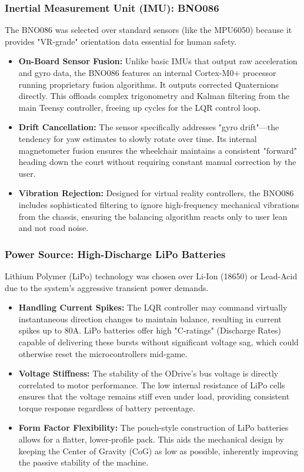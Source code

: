 \documentclass[12pt]{article}
\begin{document}
\subsubsection{Inertial Measurement Unit (IMU): BNO086}
The BNO086 was selected over standard sensors (like the MPU6050) because it provides "VR-grade" orientation data essential for human safety.
\begin{itemize}
    \item \textbf{On-Board Sensor Fusion:} Unlike basic IMUs that output raw acceleration and gyro data, the BNO086 features an internal Cortex-M0+ processor running proprietary fusion algorithms. It outputs corrected Quaternions directly. This offloads complex trigonometry and Kalman filtering from the main Teensy controller, freeing up cycles for the LQR control loop.
    \item \textbf{Drift Cancellation:} The sensor specifically addresses "gyro drift"—the tendency for yaw estimates to slowly rotate over time. Its internal magnetometer fusion ensures the wheelchair maintains a consistent "forward" heading down the court without requiring constant manual correction by the user.
    \item \textbf{Vibration Rejection:} Designed for virtual reality controllers, the BNO086 includes sophisticated filtering to ignore high-frequency mechanical vibrations from the chassis, ensuring the balancing algorithm reacts only to user lean and not road noise.
\end{itemize}

\subsubsection{Power Source: High-Discharge LiPo Batteries}
Lithium Polymer (LiPo) technology was chosen over Li-Ion (18650) or Lead-Acid due to the system's aggressive transient power demands.
\begin{itemize}
    \item \textbf{Handling Current Spikes:} The LQR controller may command virtually instantaneous direction changes to maintain balance, resulting in current spikes up to 80A. LiPo batteries offer high "C-ratings" (Discharge Rates) capable of delivering these bursts without significant voltage sag, which could otherwise reset the microcontrollers mid-game.
    \item \textbf{Voltage Stiffness:} The stability of the ODrive's bus voltage is directly correlated to motor performance. The low internal resistance of LiPo cells ensures that the voltage remains stiff even under load, providing consistent torque response regardless of battery percentage.
    \item \textbf{Form Factor Flexibility:} The pouch-style construction of LiPo batteries allows for a flatter, lower-profile pack. This aids the mechanical design by keeping the Center of Gravity (CoG) as low as possible, inherently improving the passive stability of the machine.
\end{itemize}
\end{document}

